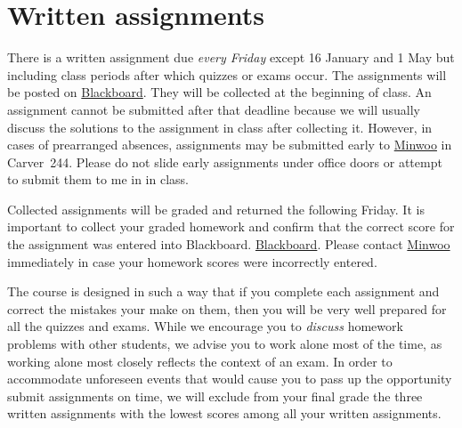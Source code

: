 \documentclass[11pt]{article}
\begin{document}
\section{Written assignments}\label{Written}
There is a written assignment due {\em every 
Friday} except 16 January and 1 May
but including class periods
after which quizzes or exams occur.
The assignments will be posted on \href{https://bb.its.iastate.edu}{Blackboard}.
They will be collected at the beginning
of class. An assignment cannot be submitted after that deadline
because we will usually discuss the solutions to the assignment
in class after collecting it.
However, in cases of prearranged absences, assignments may be submitted
early to \href{mailto:mws@iastate.edu}{Minwoo} in Carver~244.
Please do not slide early assignments under office doors or attempt
to submit them to me in in class.

Collected assignments will be graded and returned the following Friday.
It is important to collect your graded homework and confirm that the correct
score for the assignment was entered into Blackboard.
\href{https://bb.its.iastate.edu}{Blackboard}. Please contact
\href{mailto:mws@iastate.edu}{Minwoo} immediately in case your homework scores
were incorrectly entered.

The course is designed in such a way that if you complete each assignment and 
correct the mistakes your make on them,
then you will be very well prepared for all the quizzes and exams.
While we encourage you to {\em discuss} homework problems with other
students, we advise you to work alone most of the time,
as working alone most closely reflects the context of an exam.
In order to accommodate unforeseen events that would cause you
to pass up the opportunity submit assignments on time,
we will exclude from your final grade
the three written assignments with the lowest scores among
all your written assignments.
\end{document}

